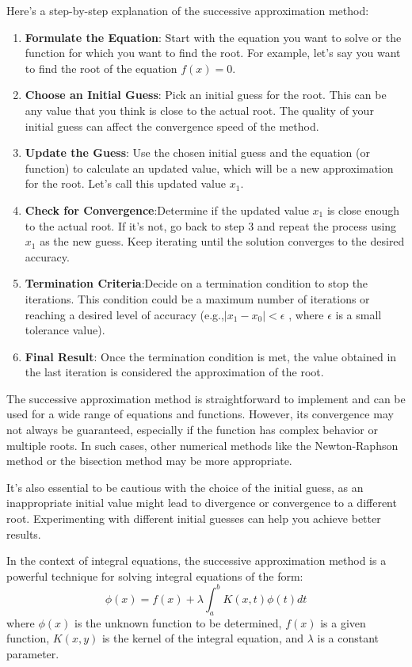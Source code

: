 \documentclass[]{article}
\begin{document}
Here's a step-by-step explanation of the successive approximation method:

\begin{enumerate}[itemsep=10pt]
    \item \textbf{Formulate the Equation}: Start with the equation you want to solve or the function for which you want to find the root. For example, let's say you want to find the root of the equation $f(x)=0$.
    \item \textbf{Choose an Initial Guess}: Pick an initial guess for the root. This can be any value that you think is close to the actual root. The quality of your initial guess can affect the convergence speed of the method.
    \item \textbf{Update the Guess}: Use the chosen initial guess and the equation (or function) to calculate an updated value, which will be a new approximation for the root. Let's call this updated value $x_1$.
    \item \textbf{Check for Convergence}:Determine if the updated value $x_1$ is close enough to the actual root. If it's not, go back to step 3 and repeat the process using $x_1$ as the new guess. Keep iterating until the solution converges to the desired accuracy.
    \item \textbf{Termination Criteria}:Decide on a termination condition to stop the iterations. This condition could be a maximum number of iterations or reaching a desired level of accuracy (e.g.,$|x_1-x_0|<\epsilon$ , where $\epsilon$ is a small tolerance value).
    \item \textbf{Final Result}: Once the termination condition is met, the value obtained in the last iteration is considered the approximation of the root.
\end{enumerate}
The successive approximation method is straightforward to implement and can be used for a wide range of equations and functions. However, its convergence may not always be guaranteed, especially if the function has complex behavior or multiple roots. In such cases, other numerical methods like the Newton-Raphson method or the bisection method may be more appropriate.

It's also essential to be cautious with the choice of the initial guess, as an inappropriate initial value might lead to divergence or convergence to a different root. Experimenting with different initial guesses can help you achieve better results.

In the context of integral equations, the successive approximation method is a powerful technique for solving integral equations of the form:
\[
\phi(x) = f(x) + \lambda\int_{a}^{b} K(x,t) \phi(t)dt    
\]
where $\phi(x)$ is the unknown function to be determined,
$f(x)$  is a given function, $K(x,y)$ is the kernel of the integral equation,
and $\lambda$ is a constant parameter.
\end{document}
